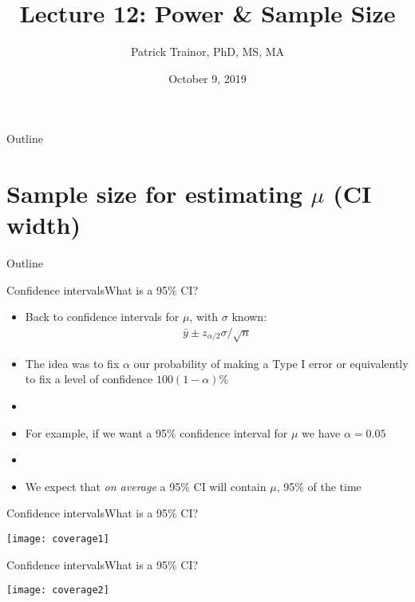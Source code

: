 \documentclass[xcolor=dvipsnames]{beamer}
\title[Lecture 12]{Lecture 12: Power \& Sample Size}
\author[Patrick Trainor]{Patrick Trainor, PhD, MS, MA}
\institute[NMSU]{New Mexico State University}
\date{October 9, 2019}
\begin{document}
\begin{frame}
\maketitle
\end{frame}

\begin{frame}{Outline}
\tableofcontents[hideallsubsections]
\end{frame}

\section{Sample size for estimating $\mu$ (CI width)}

\begin{frame}{Outline}
\tableofcontents[currentsection,subsectionstyle=show/shaded/hide]
\end{frame}

\begin{frame}{Confidence intervals}{What is a 95\% CI?}
\begin{itemize}
	\item Back to confidence intervals for $\mu$, with $\sigma$ known:
	\begin{gather*}
		\bar{y}\pm z_{\alpha/2} \sigma / \sqrt{n}
	\end{gather*}  \pause
	\item The idea was to fix $\alpha$ our probability of making a Type I error or equivalently to fix a level of confidence $100(1-\alpha)\%$ \pause
	\item[]
	\item For example, if we want a 95\% confidence interval for $\mu$ we have $\alpha = 0.05$  \pause
	\item[]
	\item We expect that \emph{on average} a 95\% CI will contain $\mu$,  95\% of the time
\end{itemize}
\end{frame}

\begin{frame}{Confidence intervals}{What is a 95\% CI?}
	\begin{center}
		\texttt{[image: coverage1]}
	\end{center}
\end{frame}

\begin{frame}{Confidence intervals}{What is a 95\% CI?}
\begin{center}
	\texttt{[image: coverage2]}
\end{center}
\end{frame}
\end{document}
